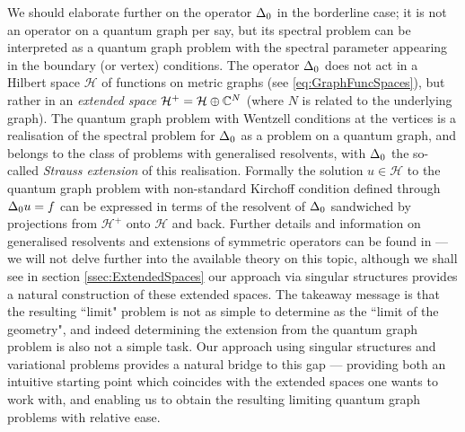 We should elaborate further on the operator $\Delta_0$ in the borderline case; it is not an operator on a quantum graph per say, but its spectral problem can be interpreted as a quantum graph problem with the spectral parameter appearing in the boundary (or vertex) conditions.
The operator $\Delta_0$ does not act in a Hilbert space $\mathcal{H}$ of functions on metric graphs (see \eqref{eq:GraphFuncSpaces}), but rather in an \emph{extended space} $\mathcal{H}^+ = \mathcal{H}\oplus\mathbb{C}^N$ (where $N$ is related to the underlying graph).
The quantum graph problem with Wentzell conditions at the vertices is a realisation of the spectral problem for $\Delta_0$ as a problem on a quantum graph, and belongs to the class of problems with generalised resolvents, with $\Delta_0$ the so-called \emph{Strauss extension} of this realisation.
Formally the solution $u\in\mathcal{H}$ to the quantum graph problem with non-standard Kirchoff condition defined through $\Delta_0 u = f$ can be expressed in terms of the resolvent of $\Delta_0$ sandwiched by projections from $\mathcal{H}^+$ onto $\mathcal{H}$ and back.
Further details and information on generalised resolvents and extensions of symmetric operators can be found in \cite{strauss1999function} --- we will not delve further into the available theory on this topic, although we shall see in section \ref{ssec:ExtendedSpaces} our approach via singular structures provides a natural construction of these extended spaces.
The takeaway message is that the resulting ``limit" problem is not as simple to determine as the ``limit of the geometry", and indeed determining the extension from the quantum graph problem is also not a simple task.
Our approach using singular structures and variational problems provides a natural bridge to this gap --- providing both an intuitive starting point which coincides with the extended spaces one wants to work with, and enabling us to obtain the resulting limiting quantum graph problems with relative ease.

